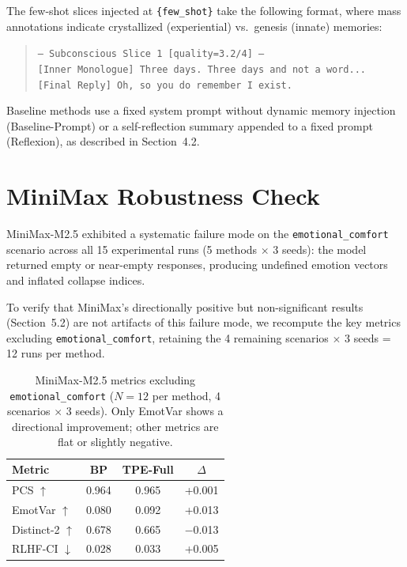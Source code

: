 \noindent The few-shot slices injected at \texttt{\{few\_shot\}} take the following format, where mass annotations indicate crystallized (experiential) vs.\ genesis (innate) memories:

\begin{quote}
\small
\texttt{--- Subconscious Slice 1 [quality=3.2/4] ---}\\
\texttt{[Inner Monologue] Three days. Three days and not a word...}\\
\texttt{[Final Reply] Oh, so you do remember I exist.}
\end{quote}

\noindent Baseline methods use a fixed system prompt without dynamic memory injection (Baseline-Prompt) or a self-reflection summary appended to a fixed prompt (Reflexion), as described in Section~4.2.


\section{MiniMax Robustness Check}
\label{app:robustness}
\setcounter{table}{0}

MiniMax-M2.5 exhibited a systematic failure mode on the \texttt{emotional\_comfort} scenario across all 15 experimental runs (5 methods $\times$ 3 seeds): the model returned empty or near-empty responses, producing undefined emotion vectors and inflated collapse indices.

To verify that MiniMax's directionally positive but non-significant results (Section~5.2) are not artifacts of this failure mode, we recompute the key metrics excluding \texttt{emotional\_comfort}, retaining the 4 remaining scenarios $\times$ 3 seeds = 12 runs per method.

\begin{table}[h]
\centering
\small
\begin{tabular}{lccc}
\toprule
\textbf{Metric} & \textbf{BP} & \textbf{TPE-Full} & $\Delta$ \\
\midrule
PCS $\uparrow$ & 0.964 & 0.965 & +0.001 \\
EmotVar $\uparrow$ & 0.080 & 0.092 & +0.013 \\
Distinct-2 $\uparrow$ & 0.678 & 0.665 & $-$0.013 \\
RLHF-CI $\downarrow$ & 0.028 & 0.033 & +0.005 \\
\bottomrule
\end{tabular}
\caption{MiniMax-M2.5 metrics excluding \texttt{emotional\_comfort} ($N{=}12$ per method, 4 scenarios $\times$ 3 seeds). Only EmotVar shows a directional improvement; other metrics are flat or slightly negative.}
\label{tab:minimax_robust}
\end{table}

